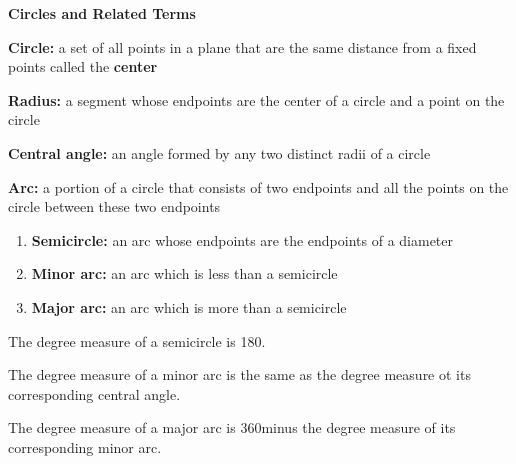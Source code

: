 \begin{center}
\textbf{Circles and Related Terms}
\end{center}

\vspace*{1ex}


\textbf{Circle: } a set of all points in a plane that are the same distance from a fixed points called the \textbf{center} 

\vspce 

\textbf{Radius:} a segment whose endpoints are the center of a circle and a point on the circle

\vspce 

\textbf{Central angle:} an angle formed by any two distinct radii of a circle

\vspce 

\textbf{Arc:} a portion of a circle that consists of two endpoints and all the points on the circle between these two endpoints

\vspce 

\begin{enumerate}[label = \alph*. ]
\item \hspce \textbf{Semicircle:} an arc whose endpoints are the endpoints of a diameter
\item \hspce \textbf{Minor arc:} an arc which is less than a semicircle
\item \hspce \textbf{Major arc:} an arc which is more than a semicircle
\end{enumerate} 

The degree measure of a semicircle is 180\degree. 

\vspce 

The degree measure of a minor arc is the same as the degree measure ot its corresponding central angle. 

\vspce 

The degree measure of a major arc is 360\degree \hspce minus the degree measure of its corresponding minor arc. 


